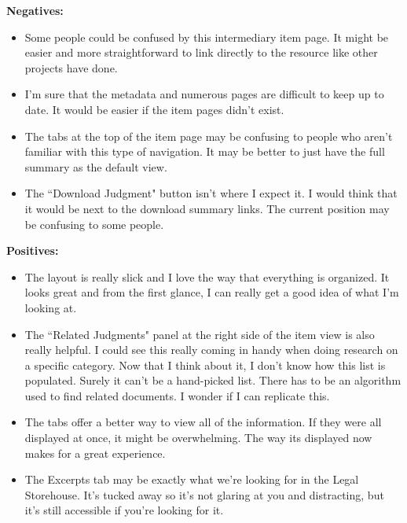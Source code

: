 \documentclass{article}
\begin{document}
\noindent\textbf{Negatives:}
\begin{itemize}
\itemsep0em 
    \item Some people could be confused by this intermediary item page. It might be easier and more straightforward to link directly to the resource like other projects have done.
    \item I'm sure that the metadata and numerous pages are difficult to keep up to date. It would be easier if the item pages didn't exist.
    \item The tabs at the top of the item page may be confusing to people who aren't familiar with this type of navigation. It may be better to just have the full summary as the default view.
    \item The ``Download Judgment" button isn't where I expect it. I would think that it would be next to the download summary links. The current position may be confusing to some people.
\end{itemize}

\noindent\textbf{Positives:}
\begin{itemize}
\itemsep0em 
    \item The layout is really slick and I love the way that everything is organized. It looks great and from the first glance, I can really get a good idea of what I'm looking at.
    \item The ``Related Judgments" panel at the right side of the item view is also really helpful. I could see this really coming in handy when doing research on a specific category. Now that I think about it, I don't know how this list is populated. Surely it can't be a hand-picked list. There has to be an algorithm used to find related documents. I wonder if I can replicate this. 
    \item The tabs offer a better way to view all of the information. If they were all displayed at once, it might be overwhelming. The way its displayed now makes for a great experience.
    \item The Excerpts tab may be exactly what we're looking for in the Legal Storehouse. It's tucked away so it's not glaring at you and distracting, but it's still accessible if you're looking for it.
\end{itemize}
\end{document}
